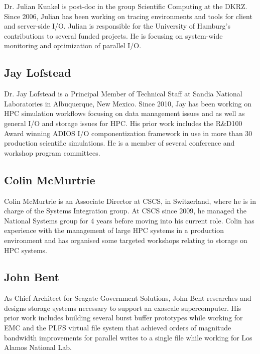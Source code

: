 \documentclass[a4paper,10pt]{article}
\begin{document}
Dr. Julian Kunkel is post-doc in the group Scientific Computing at the DKRZ.
Since 2006, Julian has been working on tracing environments and tools for client and server-side I/O.
Julian is responsible for the University of Hamburg's contributions to several funded projects.  
He is focusing on system-wide monitoring and optimization of parallel I/O.

\subsection{Jay Lofstead}
Dr. Jay Lofstead is a Principal Member of Technical Staff at Sandia National
Laboratories in Albuquerque, New Mexico. Since 2010, Jay has been working on
HPC simulation workflows focusing on data management issues and as well as
general I/O and storage issues for HPC.  His prior work includes the R\&D100
Award winning ADIOS I/O componentization framework in use in more than 30
production scientific simulations. He is a member of several conference and
workshop program committees.

\subsection{Colin McMurtrie}
Colin McMurtrie is an Associate Director at CSCS, in Switzerland, where he is in charge of the Systems Integration group.  At CSCS since 2009, he managed the National Systems group for 4 years before moving into his current role.  Colin has experience with the management of large HPC systems in a production environment and has organised some targeted workshops relating to storage on HPC systems.

\subsection{John Bent}
As Chief Architect for Seagate Government Solutions, John Bent researches and designs storage systems necessary to support an exascale supercomputer.  His prior work
includes building several burst buffer prototypes while working for EMC and the PLFS virtual file system that achieved orders of magnitude bandwidth improvements for parallel writes to a single file while working for Los Alamos National Lab.
\end{document}
